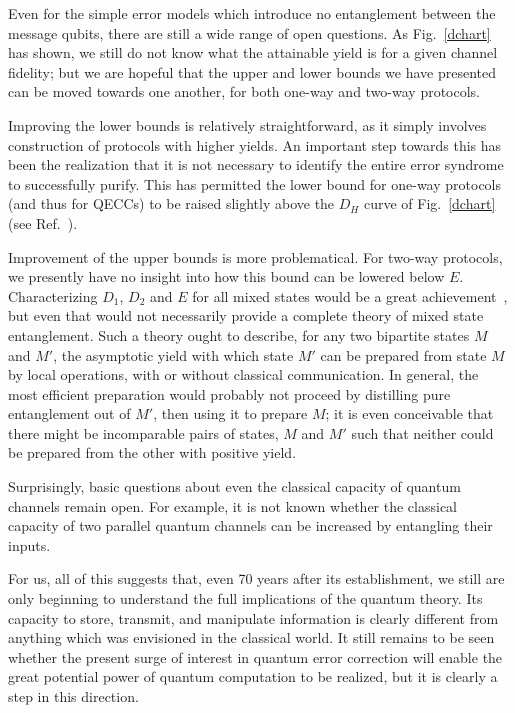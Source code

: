Even for the simple error models which introduce no entanglement
between the message qubits, there are still a wide range of open
questions.  As Fig.~\ref{dchart} has shown, we still do not know
what the attainable yield is for a given channel fidelity; but we
are hopeful that the upper and lower bounds we have presented can
be moved towards one another, for both one-way and two-way protocols.
 
Improving the lower bounds is relatively straightforward, as it simply
involves construction of protocols with higher yields.  An
important step towards this has been the realization that it is not
necessary to identify the entire error syndrome to successfully purify. 
This has permitted the lower bound for one-way protocols (and thus for
QECCs) to be raised slightly above the $D_H$ curve of
Fig.~\ref{dchart} (see Ref.~\cite{jumpthegun}). 
 
Improvement of the upper bounds is more problematical.  For two-way
protocols, we presently have no insight into how this bound can be
lowered below $E$.   Characterizing $D_1$, $D_2$ and $E$ for all mixed
states would be a great achievement~\cite{H3distill}, but even that would not necessarily
provide a complete theory of mixed state entanglement. Such a theory
ought to describe, for any two bipartite states $M$ and $M'$, the
asymptotic yield with which state $M'$ can be prepared from state $M$ by
local operations, with or without classical communication.  In general,
the most efficient preparation would probably not proceed by distilling
pure entanglement out of $M'$, then using it to prepare $M$; it is even
conceivable that there might be incomparable pairs of states, $M$ and
$M'$ such that neither could be prepared from the other with positive
yield.

Surprisingly, basic questions about even the classical capacity of
quantum channels remain open.  For example, it is not known whether
the classical capacity of two parallel quantum
channels can be increased by entangling their inputs.

For us, all of this suggests that, even 70 years after its
establishment,
we still are only beginning to understand the full
implications of the quantum theory.  Its capacity to store,
transmit, and manipulate information is clearly different from
anything which was envisioned in the classical world.  It still
remains to be seen whether the present surge of interest in
quantum error correction will enable the great potential power of
quantum computation to be realized, but it is clearly a step in this
direction.

